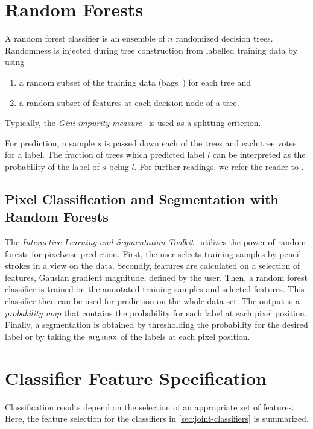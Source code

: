 \chapter{Random Forests}
\label{cha:app-rf}
A random forest classifier is an ensemble of $n$ randomized decision trees. Randomness is injected
during tree construction from labelled training data by using
\begin{enumerate}
      \item a random subset of the training data (bags~\citealp{breiman_96_bagging}) for each tree
    and
      \item a random subset of features at each decision node of a tree.
\end{enumerate}
Typically, the \emph{Gini impurity measure}~\citep{breiman_84_classification,ceriani_12_origins} is
used as a splitting criterion.

For prediction, a sample $s$ is passed down each of the trees and each tree votes for a label. The
fraction of trees which predicted label $l$ can be interpreted as the probability of the label of $s$
being $l$. For further readings, we refer the reader to \citet{breiman_01_random,biau_12_analysis}.

\section{Pixel Classification and Segmentation with Random Forests}
The \emph{Interactive Learning and Segmentation Toolkit}~\citep{sommer_11_ilastik} utilizes the
power of random forests for pixelwise prediction. First, the user selects training samples by pencil
strokes in a view on the data. Secondly, features are calculated on a selection of features, \eg
Gausian gradient magnitude, defined by the user. Then, a random forest classifier is trained on the
annotated training samples and selected features. This classifier then can be used for prediction on
the whole data set. The output is a \emph{probability map} that contains the probability for each
label at each pixel position. Finally, a segmentation is obtained by thresholding the probability
for the desired label or by taking the $\operatorname*{arg\,max}$ of the labels at each pixel position.


\chapter{Classifier Feature Specification}
\label{cha:app-joint-classifier-features}
Classification results depend on the selection of an appropriate set of features. Here, the
feature selection for the classifiers in \cref{sec:joint-classifiers} is summarized.

